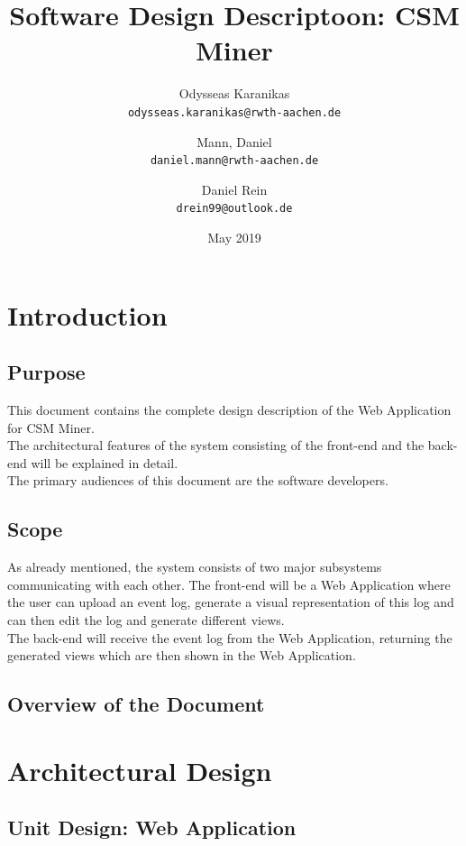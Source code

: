 \documentclass[12pt]{extarticle}
\title{Software Design Descriptoon: CSM Miner}
\author{
Odysseas Karanikas\\
\texttt{odysseas.karanikas@rwth-aachen.de}
\and
Mann, Daniel\\
\texttt{daniel.mann@rwth-aachen.de}
\and
Daniel Rein\\
\texttt{drein99@outlook.de}
}
\date{May 2019}
\begin{document}
\maketitle

\section{Introduction}
\subsection{Purpose}
This document contains the complete design description of the Web Application for CSM Miner. \\
The architectural features of the system consisting of the front-end and the back-end will be explained in detail. \\
The primary audiences of this document are the software developers. 

\subsection{Scope}
As already mentioned, the system consists of two major subsystems communicating with each other. The front-end will be a Web Application where the user can upload an event log, generate a visual representation of this log and can then edit the log and generate different views. \\
The back-end will receive the event log from the Web Application, returning the generated views which are then shown in the Web Application.

\subsection{Overview of the Document}

\section{Architectural Design}

\subsection{Unit Design: Web Application}
\end{document}
